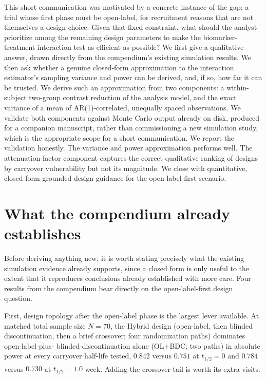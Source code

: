 \documentclass[
  11pt,
]{article}
\begin{document}
This short communication was motivated by a concrete instance of the
gap: a trial whose first phase must be open-label, for recruitment
reasons that are not themselves a design choice. Given that fixed
constraint, what should the analyst prioritize among the remaining
design parameters to make the biomarker-treatment interaction test as
efficient as possible? We first give a qualitative answer, drawn
directly from the compendium's existing simulation results. We then
ask whether a genuine closed-form approximation to the interaction
estimator's sampling variance and power can be derived, and, if so,
how far it can be trusted. We derive such an approximation from two
components: a within-subject two-group contrast reduction of the
analysis model, and the exact variance of a mean of AR(1)-correlated,
unequally spaced observations. We validate both components against
Monte Carlo output already on disk, produced for a companion
manuscript, rather than commissioning a new simulation study,
which is the appropriate scope for a short communication. We
report the validation honestly. The variance and power
approximation performs well. The attenuation-factor component
captures the correct qualitative ranking of designs by carryover
vulnerability but not its magnitude. We close
with quantitative, closed-form-grounded design guidance for the
open-label-first scenario.

\section{What the compendium already establishes}\label{what-the-compendium-already-establishes}

Before deriving anything new, it is worth stating precisely what the
existing simulation evidence already supports, since a closed form is
only useful to the extent that it reproduces conclusions already
established with more care. Four results from the compendium bear
directly on the open-label-first design question.

First, design topology after the open-label phase is the largest
lever available. At matched total sample size \(N=70\), the Hybrid
design (open-label, then blinded discontinuation, then a brief
crossover; four randomization paths) dominates open-label-plus-
blinded-discontinuation alone (OL+BDC; two paths) in absolute power
at every carryover half-life tested, \(0.842\) versus \(0.751\) at
\(t_{1/2}=0\) and \(0.784\) versus \(0.730\) at \(t_{1/2}=1.0\) week\textsuperscript{}. Adding the crossover tail is worth its extra
visits.
\end{document}

